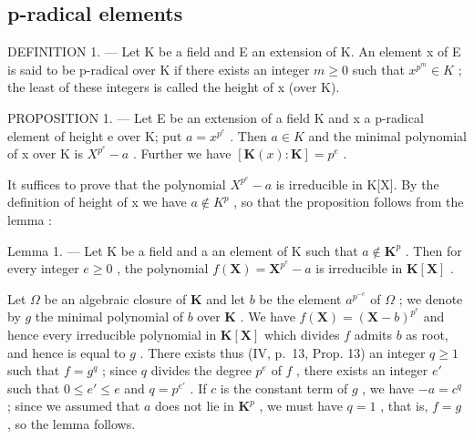 \subsection{p-radical elements}

DEFINITION 1. --- Let K be a field and E an extension of K. An element x of E is said to be p-radical over K if there exists an integer \(m \geqslant 0\) such that \(x^{p^{m}} \in K\) ; the least of these integers is called the height of x (over K).

PROPOSITION 1. --- Let E be an extension of a field K and x a p-radical element of height e over K; put \(a = x^{p^{e}}\) . Then \(a \in K\) and the minimal polynomial of x over K is \(X^{p^{e}} - a\) . Further we have \([\mathbf{K}(x): \mathbf{K}] = p^{e}\) .

It suffices to prove that the polynomial \(X^{p^{e}} - a\) is irreducible in K{[}X{]}. By the definition of height of x we have \(a \notin K^{p}\) , so that the proposition follows from the lemma :

Lemma 1. --- Let K be a field and a an element of K such that \(a \notin \mathbf{K}^p\) . Then for every integer \(e \geqslant 0\) , the polynomial \(f(\mathbf{X}) = \mathbf{X}^{p^e} - a\) is irreducible in \(\mathbf{K}[\mathbf{X}]\) .

Let \(\Omega\) be an algebraic closure of \(\mathbf{K}\) and let \(b\) be the element \(a^{p^{-e}}\) of \(\Omega\) ; we denote by \(g\) the minimal polynomial of \(b\) over \(\mathbf{K}\) . We have \(f(\mathbf{X}) = (\mathbf{X} - b)^{p^e}\) and hence every irreducible polynomial in \(\mathbf{K}[\mathbf{X}]\) which divides \(f\) admits \(b\) as root, and hence is equal to \(g\) . There exists thus (IV, p.~13, Prop. 13) an integer \(q \geqslant 1\) such that \(f = g^q\) ; since \(q\) divides the degree \(p^e\) of \(f\) , there exists an integer \(e'\) such that \(0 \leqslant e' \leqslant e\) and \(q = p^{e'}\) . If \(c\) is the constant term of \(g\) , we have \(-a = c^q\) ; since we assumed that \(a\) does not lie in \(\mathbf{K}^p\) , we must have \(q = 1\) , that is, \(f = g\) , so the lemma follows.

